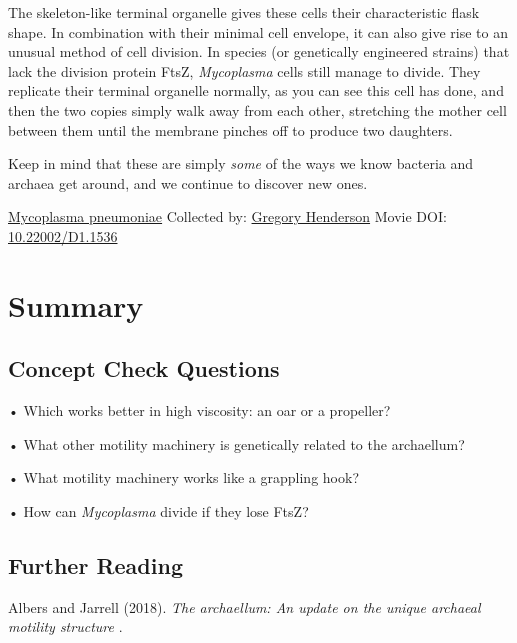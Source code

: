 \documentclass[]{tufte-book}
\begin{document}
The skeleton-like terminal organelle gives these cells their characteristic flask shape. In combination with their minimal cell envelope, it can also give rise to an unusual method of cell division. In species (or genetically engineered strains) that lack the division protein FtsZ, \emph{Mycoplasma} cells still manage to divide. They replicate their terminal organelle normally, as you can see this cell has done, and then the two copies simply walk away from each other, stretching the mother cell between them until the membrane pinches off to produce two daughters.

Keep in mind that these are simply \emph{some} of the ways we know bacteria and archaea get around, and we continue to discover new ones.



\hypertarget{htmlwidget-da1d1793855fd2a4efd5}{}

\label{fig:6-12}\protect\hyperlink{tree}{Mycoplasma pneumoniae} Collected by: \protect\hyperlink{gregory_henderson}{Gregory Henderson} Movie DOI: \href{https://doi.org/10.22002/D1.1536}{10.22002/D1.1536}

\hypertarget{summary-5}{%
\section{Summary}\label{summary-5}}

\hypertarget{concept-check-questions-5}{%
\subsection*{Concept Check Questions}\label{concept-check-questions-5}}

• Which works better in high viscosity: an oar or a propeller?

• What other motility machinery is genetically related to the archaellum?

• What motility machinery works like a grappling hook?

• How can \emph{Mycoplasma} divide if they lose FtsZ?

\hypertarget{further-reading-5}{%
\subsection*{Further Reading}\label{further-reading-5}}

Albers and Jarrell (2018). \emph{The archaellum: An update on the unique archaeal motility structure} \citep{albers2018}.
\end{document}
